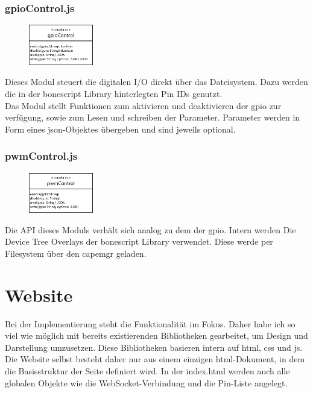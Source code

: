 \subsubsection{gpioControl.js}
\begin{figure}
  \vspace{-16pt}
  \centering
  \includegraphics[width = 0.25\textwidth]{dokumentation/images/apiGPIOControl.eps}
\end{figure}

Dieses Modul steuert die digitalen I/O direkt über das Dateisystem. Dazu werden die in der bonescript Library hinterlegten Pin IDs genutzt.\\

Das Modul stellt Funktionen zum aktivieren und deaktivieren der \gls{gpio} zur verfügung, sowie zum Lesen und schreiben der Parameter. Parameter werden in Form eines \gls{json}-Objektes übergeben und sind jeweils optional.

\subsubsection{pwmControl.js}
\begin{figure}
  \vspace{-16pt}
  \centering
  \includegraphics[width = 0.25\textwidth]{dokumentation/images/apiPWMControl.eps}
\end{figure}

Die API dieses Moduls verhält sich analog zu dem der \gls{gpio}. Intern werden Die Device Tree Overlays der bonescript Library verwendet. Diese werde per Filesystem über den \gls{capemgr} geladen.

\section{Website} Bei der Implementierung steht die Funktionalität im Fokus. Daher habe ich so viel wie möglich mit bereits existierenden Bibliotheken gearbeitet, um Design und Darstellung umzusetzen. Diese Bibliotheken basieren intern auf \gls{html}, \gls{css} und \gls{js}.\\
Die Website selbst besteht daher nur aus einem einzigen \gls{html}-Dokument, in dem die Basisstruktur der Seite definiert wird. In der index.html werden auch alle globalen Objekte wie die WebSocket-Verbindung und die Pin-Liste angelegt.\\

